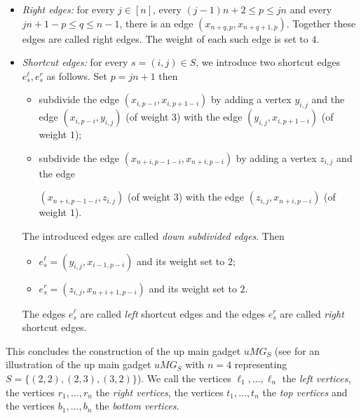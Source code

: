 \begin{itemize}
\item \emph{Right edges:} for every $j \in [n]$, every $(j-1)n+2 \leq p \leq jn$ and every $jn+1-p \leq q \leq n-1$, there is an edge $(x_{n+q,p},x_{n+q+1,p})$. Together these edges are called right edges. The weight of each such edge is set to $4$.
\item \emph{Shortcut edges:} for every $s=(i,j) \in S$, we introduce two shortcut edges $e^\ell_s,e^r_s$ as follows. Set $p = jn+1$ then
\begin{itemize}
\item subdivide the edge $(x_{i,p-i},x_{i,p+1-i})$ by adding a vertex $y_{i,j}$ and the edge $(x_{i,p-i},y_{i,j})$ (of weight $3$) with the edge $(y_{i,j},x_{i,p+1-i})$ (of weight $1$);
\item subdivide the edge $(x_{n+i,p-1-i},x_{n+i,p-i})$ by adding a vertex $z_{i,j}$ and the edge 

$(x_{n+i,p-1-i},z_{i,j})$ (of weight $3$) with the edge $(z_{i,j},x_{n+i,p-i})$ (of weight $1$). 
\end{itemize}
The introduced edges are called \emph{down subdivided edges}. Then
\begin{itemize}
\item $e^\ell_s= (y_{i,j},x_{i-1,p-i})$ and its weight set to $2$;
\item $e^r_s = (z_{i,j},x_{n+i+1,p-i})$ and its weight set to $2$.
\end{itemize}
The edges $e^\ell_s$ are called \emph{left} shortcut edges and the edges $e^r_s$ are called \emph{right} shortcut edges.  
\end{itemize}
This concludes the construction of the up main gadget $uMG_S$ (see  for an illustration of the up main gadget $uMG_S$ with $n=4$ representing $S= \{(2,2),(2,3),(3,2)\}$). We call the vertices $\ell_1,\ldots,\ell_n$ the \emph{left vertices}, the vertices $r_1,\ldots,r_n$ the \emph{right vertices}, the vertices $t_1,\ldots,t_n$ the \emph{top vertices} and the vertices $b_1,\ldots,b_n$ the \emph{bottom vertices}.\\

